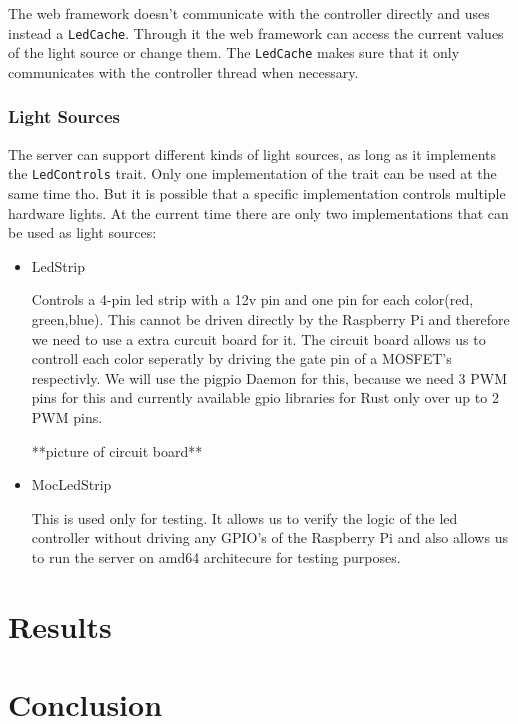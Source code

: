 \documentclass[conference]{IEEEtran}
\begin{document}
The web framework doesn't communicate with the controller directly and uses instead a \texttt{LedCache}. Through it the web framework can access the current values of the light source or change them. The \texttt{LedCache} makes sure that it only communicates with the controller thread when necessary.


\subsubsection{Light Sources}

The server can support different kinds of light sources, as long as it implements the \texttt{LedControls} trait. Only one implementation 
of the trait can be used at the same time tho. But it is possible that a specific implementation controls multiple hardware lights.
At the current time there are only two implementations that can be used as light sources:

\begin{itemize}
    \item LedStrip
    
    Controls a 4-pin led strip with a 12v pin and one pin for each color(red, green,blue). This cannot be driven directly by the
    Raspberry Pi and therefore we need to use a extra curcuit board\cite{rpiled} for it. The circuit board allows us to controll each
    color seperatly by driving the gate pin of a MOSFET's respectivly. We will use the pigpio Daemon\cite{pigpiod} for this, because we 
    need 3 PWM pins for this and currently available gpio libraries for Rust only over up to 2 PWM pins.
    
    **picture of circuit board**

    \item MocLedStrip
    
    This is used only for testing. It allows us to verify the logic of the led controller without driving any GPIO's of the Raspberry Pi 
    and also allows us to run the server on amd64 architecure for testing purposes.
\end{itemize}



\section{Results}


\section{Conclusion}
\end{document}
